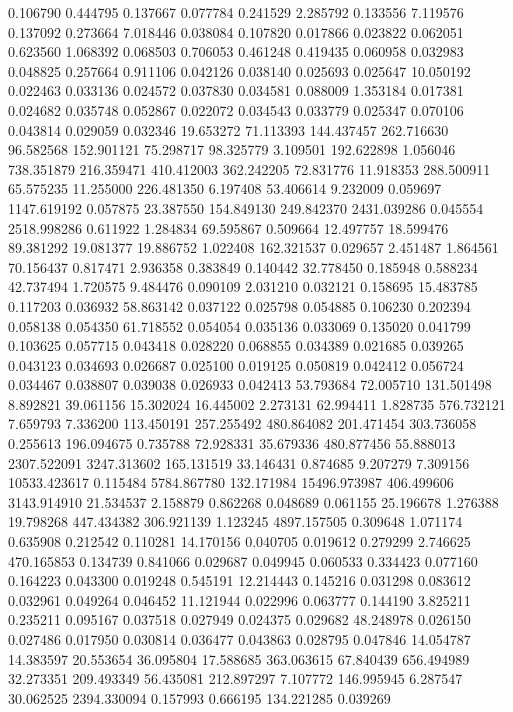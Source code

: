 0.106790
0.444795
0.137667
0.077784
0.241529
2.285792
0.133556
7.119576
0.137092
0.273664
7.018446
0.038084
0.107820
0.017866
0.023822
0.062051
0.623560
1.068392
0.068503
0.706053
0.461248
0.419435
0.060958
0.032983
0.048825
0.257664
0.911106
0.042126
0.038140
0.025693
0.025647
10.050192
0.022463
0.033136
0.024572
0.037830
0.034581
0.088009
1.353184
0.017381
0.024682
0.035748
0.052867
0.022072
0.034543
0.033779
0.025347
0.070106
0.043814
0.029059
0.032346
19.653272
71.113393
144.437457
262.716630
96.582568
152.901121
75.298717
98.325779
3.109501
192.622898
1.056046
738.351879
216.359471
410.412003
362.242205
72.831776
11.918353
288.500911
65.575235
11.255000
226.481350
6.197408
53.406614
9.232009
0.059697
1147.619192
0.057875
23.387550
154.849130
249.842370
2431.039286
0.045554
2518.998286
0.611922
1.284834
69.595867
0.509664
12.497757
18.599476
89.381292
19.081377
19.886752
1.022408
162.321537
0.029657
2.451487
1.864561
70.156437
0.817471
2.936358
0.383849
0.140442
32.778450
0.185948
0.588234
42.737494
1.720575
9.484476
0.090109
2.031210
0.032121
0.158695
15.483785
0.117203
0.036932
58.863142
0.037122
0.025798
0.054885
0.106230
0.202394
0.058138
0.054350
61.718552
0.054054
0.035136
0.033069
0.135020
0.041799
0.103625
0.057715
0.043418
0.028220
0.068855
0.034389
0.021685
0.039265
0.043123
0.034693
0.026687
0.025100
0.019125
0.050819
0.042412
0.056724
0.034467
0.038807
0.039038
0.026933
0.042413
53.793684
72.005710
131.501498
8.892821
39.061156
15.302024
16.445002
2.273131
62.994411
1.828735
576.732121
7.659793
7.336200
113.450191
257.255492
480.864082
201.471454
303.736058
0.255613
196.094675
0.735788
72.928331
35.679336
480.877456
55.888013
2307.522091
3247.313602
165.131519
33.146431
0.874685
9.207279
7.309156
10533.423617
0.115484
5784.867780
132.171984
15496.973987
406.499606
3143.914910
21.534537
2.158879
0.862268
0.048689
0.061155
25.196678
1.276388
19.798268
447.434382
306.921139
1.123245
4897.157505
0.309648
1.071174
0.635908
0.212542
0.110281
14.170156
0.040705
0.019612
0.279299
2.746625
470.165853
0.134739
0.841066
0.029687
0.049945
0.060533
0.334423
0.077160
0.164223
0.043300
0.019248
0.545191
12.214443
0.145216
0.031298
0.083612
0.032961
0.049264
0.046452
11.121944
0.022996
0.063777
0.144190
3.825211
0.235211
0.095167
0.037518
0.027949
0.024375
0.029682
48.248978
0.026150
0.027486
0.017950
0.030814
0.036477
0.043863
0.028795
0.047846
14.054787
14.383597
20.553654
36.095804
17.588685
363.063615
67.840439
656.494989
32.273351
209.493349
56.435081
212.897297
7.107772
146.995945
6.287547
30.062525
2394.330094
0.157993
0.666195
134.221285
0.039269
